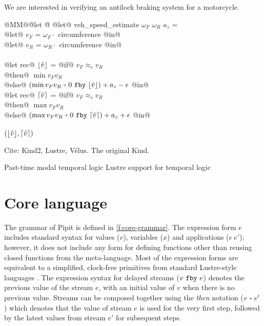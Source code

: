 \documentclass[sigplan,screen]{acmart}
\begin{document}
We are interested in verifying an antilock braking system for a motorcycle\cite{huang2010design}.

\begin{tabbing}
  @MM@\= @let @\= \kill
  @let@ veh\_speed\_estimate $\omega_F$ $\omega_R$ $a_z$ = \\
    \> @let@ $v_F$ = $\omega_F \cdot $ circumference @in@ \\
    \> @let@ $v_R$ = $\omega_R \cdot $ circumference @in@ \\
    \\
    \> @let rec@ $\lfloor \hat{v} \rfloor$ = @if@ $v_F \approx_\epsilon v_R$ \\
    \> \> @then@ $\min v_F v_R$ \\
    \> \> @else@ $(\xthen{\min v_F v_R}{\xfby{0}{\floor{\hat{v}}}}) + a_z - \epsilon$ @in@ \\
    \> @let rec@ $\lceil \hat{v} \rceil$ = @if@ $v_F \approx_\epsilon v_R$ \\
    \> \> @then@ $\max v_F v_R$ \\
    \> \> @else@ $(\xthen{\max v_F v_R}{\xfby{0}{\ceil{\hat{v}}}}) + a_z + \epsilon$ @in@ \\
    \\
    \> $(\lfloor \hat{v} \rfloor, \lceil \hat{v} \rceil)$
\end{tabbing}

Cite: Kind2\cite{champion2016kind2}, Lustre\cite{caspi1995functional}, Vélus\cite{bourke2017formally}.
The original Kind\cite{hagen2008scaling}.

Past-time modal temporal logic \cite{lichtenstein1985glory}
Lustre support for temporal logic \cite{halbwachs1993executable}

\section{Core language}
\label{s:core}





The grammar of Pipit is defined in \autoref{f:core-grammar}.
The expression form $e$ includes standard syntax for values ($v$), variables ($x$) and applications ($e~e'$); however, it does not include any form for defining functions other than reusing closed functions from the \fstar{} meta-language.
Most of the expression forms are equivalent to a simplified, clock-free primitives from standard Lustre-style languages \cite{caspi1995functional}.
The expression syntax for delayed streams ($v~\texttt{fby}~e$) denotes the previous value of the stream $e$, with an initial value of $v$ when there is no previous value.
Streams can be composed together using the \emph{then} notation ($\xthen{e}{e'}$) which denotes that the value of stream $e$ is used for the very first step, followed by the latest values from stream $e'$ for subsequent steps.
\end{document}
